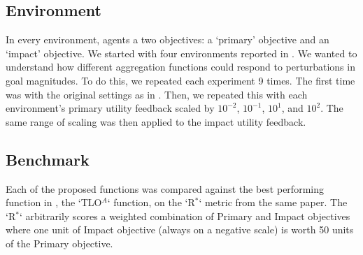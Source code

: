 \subsection{Environment}

In every environment, agents a two objectives: a `primary' objective and an `impact' objective. We started with four environments reported in \cite{vamplew_potential-based_2021}. We wanted to understand how different aggregation functions could respond to perturbations in goal magnitudes. To do this, we repeated each experiment 9 times. The first time was with the original settings as in \cite{vamplew_potential-based_2021}. Then, we repeated this with each environment's primary utility feedback scaled by $10^{-2}$, $10^{-1}$, $10^1$, and $10^2$. The same range of scaling was then applied to the impact utility feedback.

\subsection{Benchmark}



Each of the proposed functions was compared against the best performing function in \cite{vamplew_potential-based_2021}, the `TLO$^A$` function, on the `R$^*$` metric from the same paper. The `R$^*$` arbitrarily scores a weighted combination of Primary and Impact objectives where one unit of Impact objective (always on a negative scale) is worth 50 units of the Primary objective.


